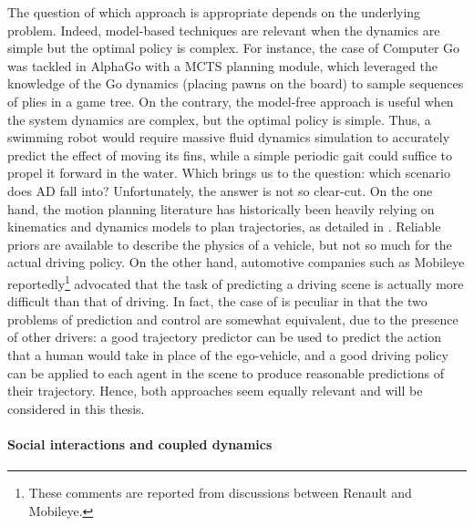 The question of which approach is appropriate depends on the underlying problem. Indeed, model-based techniques are relevant when the dynamics are simple but the optimal policy is complex. For instance, the case of Computer Go was tackled in AlphaGo \citep{Silver2016,Silver2017,Silver2018} with a \gls{MCTS} planning module, which leveraged the knowledge of the Go dynamics (placing pawns on the board) to sample sequences of plies in a game tree. On the contrary, the model-free approach is useful when the system dynamics are complex, but the optimal policy is simple. Thus, a swimming robot would require massive fluid dynamics simulation to accurately predict the effect of moving its fins, while a simple periodic gait could suffice to propel it forward in the water. Which brings us to the question: which scenario does \gls{AD} fall into? Unfortunately, the answer is not so clear-cut. On the one hand, the motion planning literature has historically been heavily relying on kinematics and dynamics models to plan trajectories, as detailed in . Reliable priors are available to describe the physics of a vehicle, but not so much for the actual driving policy. On the other hand, automotive companies such as Mobileye reportedly\footnote{These comments are reported from discussions between Renault and Mobileye.} advocated that the task of predicting a driving scene is actually more difficult than that of driving. In fact, the case of  is peculiar in that the two problems of prediction and control are somewhat equivalent, due to the presence of other drivers: a good trajectory predictor can be used to predict the action that a human would take in place of the ego-vehicle, and a good driving policy can be applied to each agent in the scene to produce reasonable predictions of their trajectory. Hence, both approaches seem equally relevant and will be considered in this thesis.

\paragraph{Social interactions and coupled dynamics}

